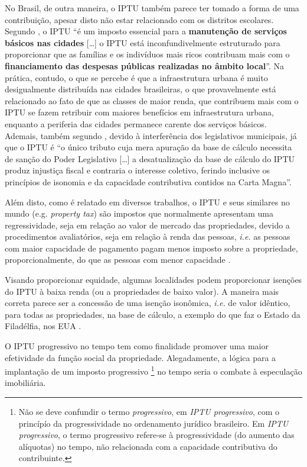 \documentclass[
	12pt,				%
	oneside,			%
	a4paper,			%
	chapter=TITLE,		%
	section=TITLE,		%
	english,			%
	brazil				%
	]{abntex2}
\begin{document}
\begin{refsection}
No Brasil, de outra maneira, o \gls{IPTU} também parece ter tomado a forma de
uma contribuição, apesar disto não estar relacionado com os distritos escolares.
Segundo \textcite[p.~86, grifo nosso]{decesare2020}, o \gls{IPTU} ``é um imposto essencial
para a \textbf{manutenção de serviços básicos nas cidades} {[}\ldots{]} o \gls{IPTU} está
inconfundivelmente estruturado para proporcionar que as famílias e os indivíduos
mais ricos contribuam mais com o \textbf{financiamento das despesas públicas
realizadas no âmbito local}''. Na prática, contudo, o que se percebe é que a
infraestrutura urbana é muito desigualmente distribuída nas cidades brasileiras,
o que provavelmente está relacionado ao fato de que as classes de maior renda,
que contribuem mais com o \gls{IPTU} se fazem retribuir com maiores benefícios
em infraestrutura urbana, enquanto a periferia das cidades permanece carente dos
serviços básicos. Ademais, também segundo \textcite[p.~83-84]{decesare2020}, devido à
interferência dos legislativos municipais, já que o \gls{IPTU} é ``o único
tributo cuja mera apuração da base de cálculo necessita de sanção do Poder
Legislativo {[}\ldots{]} a desatualização da base de cálculo do \gls{IPTU} produz
injustiça fiscal e contraria o interesse coletivo, ferindo inclusive os
princípios de isonomia e da capacidade contributiva contidos na Carta Magna''.

Além disto, como é relatado em diversos trabalhos, o \gls{IPTU} e seus similares
no mundo (e.g. \emph{property tax}) são impostos que normalmente apresentam uma
regressividade, seja em relação ao valor de mercado das propriedades, devido a
procedimentos avaliatórios, seja em relação à renda das pessoas, \emph{i.e.} as
pessoas com maior capacidade de pagamento pagam menos imposto sobre a
propriedade, proporcionalmente, do que as pessoas com menor capacidade
\autocites{McMillen2020}[p.~3]{landtax}{fonseca2020}.

Visando proporcionar equidade, algumas localidades podem proporcionar isenções
do \gls{IPTU} à baixa renda (ou a propriedades de baixo valor). A maneira mais
correta parece ser a concessão de uma isenção isonômica, \emph{i.e.} de valor
idêntico, para todas as propriedades, na base de cálculo, a exemplo do que faz o
Estado da Filadélfia, nos \gls{EUA} \autocite[p.~155]{McMillen2020}.

O \gls{IPTU} progressivo no tempo tem como finalidade promover uma maior
efetividade da função social da propriedade. Alegadamente, a lógica para a
implantação de um imposto progressivo \footnote{Não se deve confundir o termo \emph{progressivo}, em \emph{IPTU progressivo}, com o
  princípío da progressividade no ordenamento jurídico brasileiro. Em \emph{IPTU
  progressivo}, o termo progressivo refere-se à progressividade (do aumento das
  alíquotas) no tempo, não relacionada com a capacidade contributiva do
  contribuinte.} no tempo seria o combate à
especulação imobiliária.


\end{refsection}
\end{document}
